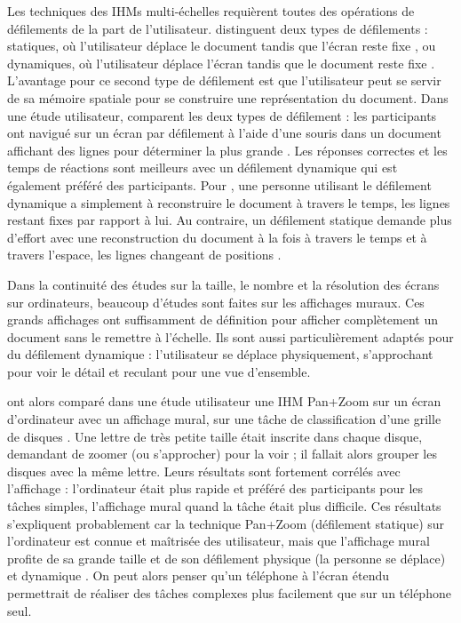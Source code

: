 Les techniques des IHMs multi-échelles requièrent toutes des opérations de défilements de la part de l'utilisateur. \cite{Mehra2006} distinguent deux types de défilements : statiques, où l'utilisateur déplace le document tandis que l'écran reste fixe , ou dynamiques, où l'utilisateur déplace l'écran tandis que le document reste fixe . L'avantage pour ce second type de défilement est que l'utilisateur peut se servir de sa mémoire spatiale pour se construire une représentation du document. Dans une étude utilisateur, \citeauthor{Mehra2006} comparent les deux types de défilement : les participants ont navigué sur un écran par défilement à l'aide d'une souris dans un document affichant des lignes pour déterminer la plus grande . Les réponses correctes et les temps de réactions sont meilleurs avec un défilement dynamique qui est également préféré des participants. Pour \citeauthor{Mehra2006}, une personne utilisant le défilement dynamique a simplement à reconstruire le document à travers le temps, les lignes restant fixes par rapport à lui. Au contraire, un défilement statique demande plus d'effort avec une reconstruction du document à la fois à travers le temps et à travers l'espace, les lignes changeant de positions .

Dans la continuité des études sur la taille, le nombre et la résolution des écrans sur ordinateurs, beaucoup d'études sont faites sur les affichages muraux. Ces grands affichages ont suffisamment de définition pour afficher complètement un document sans le remettre à l'échelle. Ils sont aussi particulièrement adaptés pour du défilement dynamique : l'utilisateur se déplace physiquement, s'approchant pour voir le détail et reculant pour une vue d'ensemble.


\cite{Liu2014} ont alors comparé dans une étude utilisateur une IHM Pan+Zoom sur un écran d'ordinateur avec un affichage mural, sur une tâche de classification d'une grille de disques . Une lettre de très petite taille était inscrite dans chaque disque, demandant de zoomer (ou s'approcher) pour la voir ; il fallait alors grouper les disques avec la même lettre. Leurs résultats sont fortement corrélés avec l'affichage : l'ordinateur était plus rapide et préféré des participants pour les tâches simples, l'affichage mural quand la tâche était plus difficile. Ces résultats s'expliquent probablement car la technique Pan+Zoom (défilement statique) sur l'ordinateur est connue et maîtrisée des utilisateur, mais que l'affichage mural profite de sa grande taille \citep{Czerwinski2003} et de son défilement physique (la personne se déplace) et dynamique \citep{Mehra2006}. On peut alors penser qu'un téléphone à l'écran étendu permettrait de réaliser des tâches complexes plus facilement que sur un téléphone seul.

